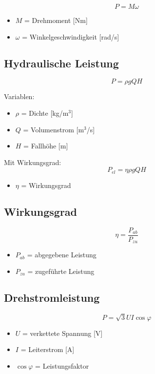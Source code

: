 \[
P = M \omega
\]

\begin{itemize}
\item $M$ = Drehmoment [Nm]
\item $\omega$ = Winkelgeschwindigkeit [rad/s]
\end{itemize}

\subsection{Hydraulische Leistung}

\[
P = \rho g Q H
\]

Variablen:
\begin{itemize}
\item $\rho$ = Dichte [kg/m$^3$]
\item $Q$ = Volumenstrom [m$^3$/s]
\item $H$ = Fallhöhe [m]
\end{itemize}

Mit Wirkungsgrad:
\[
P_{el} = \eta \rho g Q H
\]

\begin{itemize}
\item $\eta$ = Wirkungsgrad
\end{itemize}

\subsection{Wirkungsgrad}

\[
\eta = \frac{P_{ab}}{P_{zu}}
\]

\begin{itemize}
\item $P_{ab}$ = abgegebene Leistung
\item $P_{zu}$ = zugeführte Leistung
\end{itemize}

\subsection{Drehstromleistung}

\[
P = \sqrt{3} U I \cos\varphi
\]

\begin{itemize}
\item $U$ = verkettete Spannung [V]
\item $I$ = Leiterstrom [A]
\item $\cos\varphi$ = Leistungsfaktor
\end{itemize}

